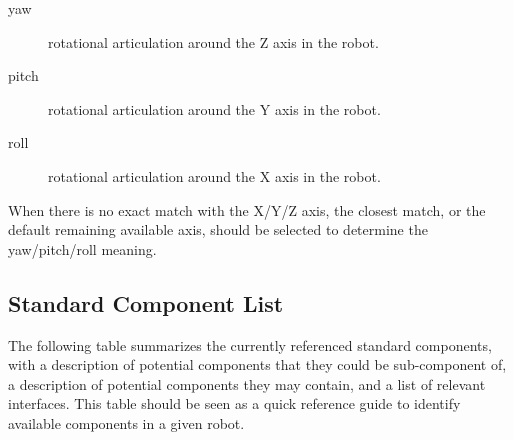 \begin{description}
\item[yaw] rotational articulation around the Z axis in the robot.
\item[pitch] rotational articulation around the Y axis in the robot.
\item[roll] rotational articulation around the X axis in the robot.
\end{description}

When there is no exact match with the X/Y/Z axis, the closest match, or
the default remaining available axis, should be selected to determine
the yaw/pitch/roll meaning.

\subsection{Standard Component List}
\label{sec:naming:components}

The following table summarizes the currently referenced standard
components, with a description of potential components that they could
be sub-component of, a description of potential components they may
contain, and a list of relevant interfaces. This table should be seen as a
quick reference guide to identify available components in a given
robot.

\newcommand{\component}[5]
{
  \lstindex{#1} &
  #5 &
  \code{#2} &
  \code{#3} &
  \code{#4}\\
  \hline
}

